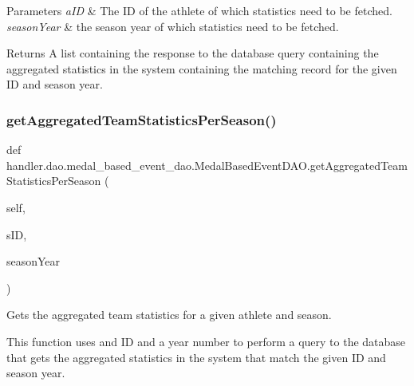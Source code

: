 \begin{DoxyParams}{Parameters}
{\em a\+ID} & The ID of the athlete of which statistics need to be fetched. \\
\hline
{\em season\+Year} & the season year of which statistics need to be fetched.\\
\hline
\end{DoxyParams}
\begin{DoxyReturn}{Returns}
A list containing the response to the database query containing the aggregated statistics in the system containing the matching record for the given ID and season year. 
\end{DoxyReturn}
\mbox{\label{classhandler_1_1dao_1_1medal__based__event__dao_1_1_medal_based_event_d_a_o_aace94c35a80076a7f173dd970f0f6441}} 
\subsubsection{\texorpdfstring{get\+Aggregated\+Team\+Statistics\+Per\+Season()}{getAggregatedTeamStatisticsPerSeason()}}
{\footnotesize\ttfamily def handler.\+dao.\+medal\+\_\+based\+\_\+event\+\_\+dao.\+Medal\+Based\+Event\+D\+A\+O.\+get\+Aggregated\+Team\+Statistics\+Per\+Season (\begin{DoxyParamCaption}\item[{}]{self,  }\item[{}]{s\+ID,  }\item[{}]{season\+Year }\end{DoxyParamCaption})}



Gets the aggregated team statistics for a given athlete and season. 

This function uses and ID and a year number to perform a query to the database that gets the aggregated statistics in the system that match the given ID and season year.


